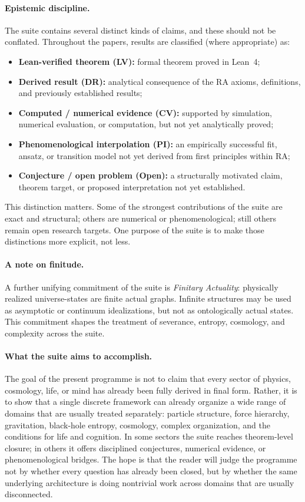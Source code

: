 \documentclass[11pt]{article}
\begin{document}
\paragraph{Epistemic discipline.}
The suite contains several distinct kinds of claims, and these should not be conflated. Throughout the papers, results are classified (where appropriate) as:
\begin{itemize}[leftmargin=1.6em,itemsep=0.4em]
    \item \textbf{Lean-verified theorem (LV):} formal theorem proved in Lean~4;
    \item \textbf{Derived result (DR):} analytical consequence of the RA axioms, definitions, and previously established results;
    \item \textbf{Computed / numerical evidence (CV):} supported by simulation, numerical evaluation, or computation, but not yet analytically proved;
    \item \textbf{Phenomenological interpolation (PI):} an empirically successful fit, ansatz, or transition model not yet derived from first principles within RA;
    \item \textbf{Conjecture / open problem (Open):} a structurally motivated claim, theorem target, or proposed interpretation not yet established.
\end{itemize}

This distinction matters. Some of the strongest contributions of the suite are exact and structural; others are numerical or phenomenological; still others remain open research targets. One purpose of the suite is to make those distinctions more explicit, not less.

\paragraph{A note on finitude.}
A further unifying commitment of the suite is \emph{Finitary Actuality}: physically realized universe-states are finite actual graphs. Infinite structures may be used as asymptotic or continuum idealizations, but not as ontologically actual states. This commitment shapes the treatment of severance, entropy, cosmology, and complexity across the suite.

\paragraph{What the suite aims to accomplish.}
The goal of the present programme is not to claim that every sector of physics, cosmology, life, or mind has already been fully derived in final form. Rather, it is to show that a single discrete framework can already organize a wide range of domains that are usually treated separately: particle structure, force hierarchy, gravitation, black-hole entropy, cosmology, complex organization, and the conditions for life and cognition. In some sectors the suite reaches theorem-level closure; in others it offers disciplined conjectures, numerical evidence, or phenomenological bridges. The hope is that the reader will judge the programme not by whether every question has already been closed, but by whether the same underlying architecture is doing nontrivial work across domains that are usually disconnected.
\end{document}
